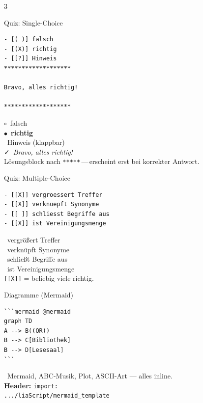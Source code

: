 \documentclass[a4paper,landscape,9pt]{extarticle}
\newcommand{\prevsm}[1]{{\footnotesize\color{muted} #1}}
\begin{document}
\begin{multicols}{3}
\begin{liacard}{Quiz: Single-Choice}
\begin{lstlisting}[language=lia]
- [( )] falsch
- [(X)] richtig
- [[?]] Hinweis
*******************

Bravo, alles richtig!

*******************
\end{lstlisting}
\tcblower
\prevsm{$\circ$~falsch\\
$\bullet$~\textbf{richtig}\\
\faQuestionCircle~Hinweis (klappbar)\\[3pt]
{\footnotesize\color{liagreen}\faCheck~\textit{Bravo, alles richtig!}}\\[2pt]
{\footnotesize Lösungsblock nach \texttt{*****}\,---\,erscheint erst bei korrekter Antwort.}}
\end{liacard}

\begin{liacard}{Quiz: Multiple-Choice}
\begin{lstlisting}[language=lia]
- [[X]] vergroessert Treffer
- [[X]] verknuepft Synonyme
- [[ ]] schliesst Begriffe aus
- [[X]] ist Vereinigungsmenge
\end{lstlisting}
\tcblower
\prevsm{\faCheckSquare~vergrößert Treffer\\
\faCheckSquare~verknüpft Synonyme\\
\faSquare~schließt Begriffe aus\\
\faCheckSquare~ist Vereinigungsmenge\\[2pt]
{\footnotesize \texttt{[[X]]} = beliebig viele richtig.}}
\end{liacard}


\begin{liacard}{Diagramme (Mermaid)}
\begin{lstlisting}[language=lia]
```mermaid @mermaid
graph TD
A --> B((OR))
B --> C[Bibliothek]
B --> D[Lesesaal]
```
\end{lstlisting}
\tcblower
\prevsm{\faProjectDiagram~Mermaid, ABC-Musik,
Plot, ASCII-Art --- alles inline.\\[2pt]
{\footnotesize \textbf{Header:} \texttt{import:}\\
\texttt{.../liaScript/mermaid\_template}}}
\end{liacard}


\end{multicols}
\end{document}
